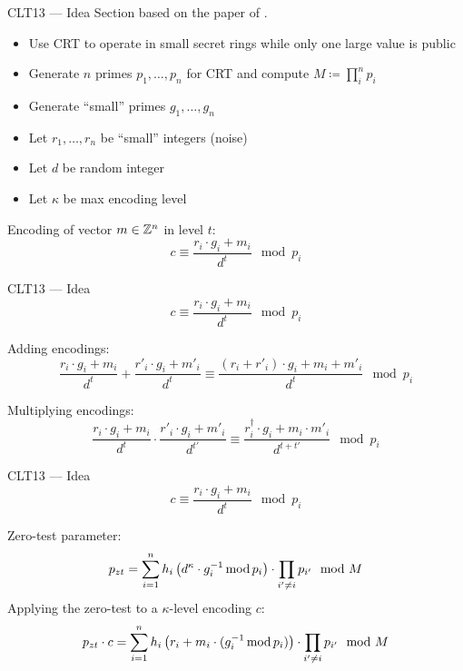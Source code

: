 \documentclass[english]{beamer}
\begin{document}
    \begin{frame}{CLT13 --- Idea}
        Section based on the paper of .

        \begin{itemize}
            \item Use CRT to operate in small secret rings while only one large value is public
            \item Generate $n$ primes $p_1, \dots, p_n$ for CRT and compute $M \coloneqq \prod_i^n p_i$
            \item Generate \enquote{small} primes $g_1, \dots, g_n$
            \item Let $r_1, \dots, r_n$ be \enquote{small} integers (noise)
            \item Let $d$ be random integer
            \item Let $\kappa$ be max encoding level
        \end{itemize}

        Encoding of vector $m \in \mathbb{Z}^n$ in level $t$:
        \begin{equation*}
            c \equiv \frac{r_i \cdot g_i + m_i}{d^t} \mod p_i
        \end{equation*}
    \end{frame}
    \begin{frame}{CLT13 --- Idea}
        \begin{equation*}
            c \equiv \frac{r_i \cdot g_i + m_i}{d^t} \mod p_i
        \end{equation*}

        Adding encodings:
        \begin{equation*}
            \frac{r_i \cdot g_i + m_i}{d^t} + \frac{r'_i \cdot g_i + m'_i}{d^t} \equiv \frac{(r_i + r'_i) \cdot g_i + m_i + m'_i}{d^t} \mod p_i
        \end{equation*}

        Multiplying encodings:
        \begin{equation*}
            \frac{r_i \cdot g_i + m_i}{d^t} \cdot \frac{r'_i \cdot g_i + m'_i}{d^{t'}} \equiv \frac{r^\dagger_i \cdot g_i + m_i \cdot m'_i}{d^{t + t'}} \mod p_i
        \end{equation*}
    \end{frame}
    \begin{frame}{CLT13 --- Idea}
        \begin{equation*}
            c \equiv \frac{r_i \cdot g_i + m_i}{d^t} \mod p_i
        \end{equation*}

        Zero-test parameter:
        \begin{equation*}
            p_{zt} = \sum_{i=1}^n h_i \left(d^\kappa \cdot g_i^{-1} \operatorname{mod} p_i\right) \cdot \prod_{i' \neq i} p_{i'} \mod M
        \end{equation*}
        \pause
        Applying the zero-test to a $\kappa$-level encoding $c$:
        \begin{equation*}
            p_{zt} \cdot c = \sum_{i=1}^n h_i \left(r_i + m_i \cdot (g_i^{-1} \operatorname{mod} p_i)\right) \cdot \prod_{i' \neq i} p_{i'} \mod M
        \end{equation*}
    \end{frame}
\end{document}
